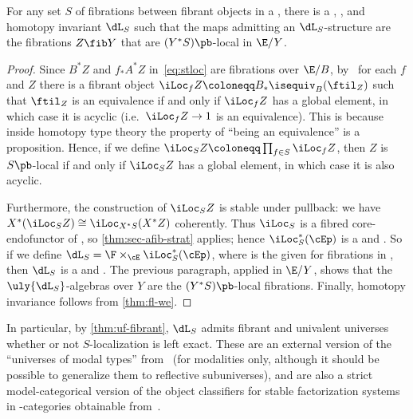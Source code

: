 \begin{prop}\label{thm:flf-nfs}
  For any set $S$ of fibrations between fibrant objects in a \ttmt \E, there is a \local, \stratified, and homotopy invariant \nfs $\dL_S$ such that the maps admitting an $\dL_S$-structure are the fibrations $Z\fib Y$ that are $(Y^*S)\pb$-local in $\E/Y$.
\end{prop}
\begin{proof}
Since $B^*Z$ and $f_* A^* Z$ in~\eqref{eq:stloc} are fibrations over $\E/B$, by~\cite[Lemma 4.3]{shulman:elreedy} %
for each $f$ and $Z$ there is a fibrant object
\( \iLoc_f Z \coloneqq B_* \isequiv_{B}(\ftil_Z) \)
such that $\ftil_Z$ is an equivalence if and only if $\iLoc_f Z$ has a global element, in which case it is acyclic (i.e.\ $\iLoc_f Z \to 1$ is an equivalence).
This is because inside homotopy type theory the property of ``being an equivalence'' is a proposition.
Hence, if we define $\iLoc_S Z \coloneqq \prod_{f\in S} \iLoc_f Z$, then $Z$ is $S\pb$-local if and only if $\iLoc_S Z$ has a global element, in which case it is also acyclic. %

Furthermore, the construction of $\iLoc_S Z$ is stable under pullback: we have $X^*(\iLoc_S Z) \cong \iLoc_{X^* S}(X^* Z)$ coherently.
Thus $\iLoc_S$ is a fibred core-endofunctor of \E, so \cref{thm:sec-afib-strat} applies; hence $\iLoc_S^*(\cEp)$ is a \local and \stratified \nfs.
  So if we define $\dL_S = \F \times_\cE \iLoc_S^*(\cEp)$, where \F is the given \nfs for fibrations in \E, then $\dL_S$ is a \local and \stratified \nfs.
  The previous paragraph, applied in $\E/Y$, shows that the $\uly{\dL_S}$-algebras over $Y$ are the $(Y^*S)\pb$-local fibrations.
  Finally, homotopy invariance follows from \cref{thm:fl-we}.
\end{proof}

\begin{rmk}\label{rmk:modal-univ}
  In particular, by \cref{thm:uf-fibrant}, $\dL_S$ admits fibrant and univalent universes whether or not $S$-localization is left exact.
  These are an external version of the ``universes of modal types'' from~\cite{rss:modalities} (for modalities only, although it should be possible to generalize them to reflective subuniverses), and are also a strict model-categorical version of the object classifiers for stable factorization systems in \io-categories obtainable from~\cite[-4]{gk:univlcc}.
\end{rmk}

